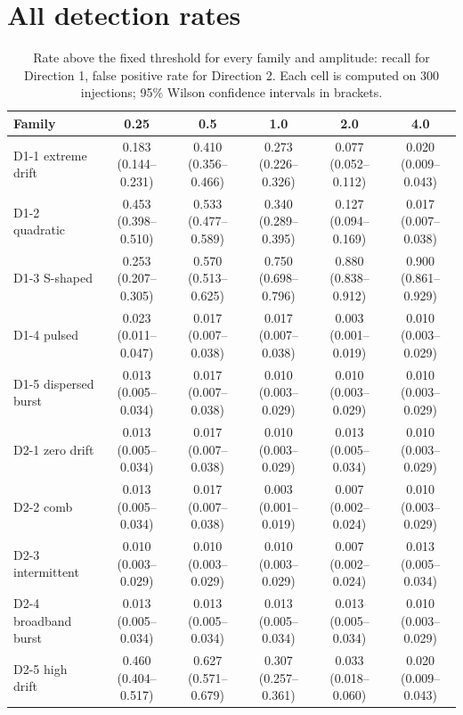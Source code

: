 \documentclass[11pt]{article}
\begin{document}
\section{All detection rates}
\begin{table}[htbp]
\centering
\footnotesize
\setlength{\tabcolsep}{3pt}
\caption{Rate above the fixed threshold for every family and amplitude: recall for Direction 1, false positive rate for Direction 2. Each cell is computed on 300 injections; 95\% Wilson confidence intervals in brackets.}
\label{tab:allrates}
\begin{tabular}{lccccc}
\toprule
Family & 0.25 & 0.5 & 1.0 & 2.0 & 4.0 \\
\midrule
D1-1 extreme drift & 0.183 \scriptsize(0.144--0.231) & 0.410 \scriptsize(0.356--0.466) & 0.273 \scriptsize(0.226--0.326) & 0.077 \scriptsize(0.052--0.112) & 0.020 \scriptsize(0.009--0.043) \\
D1-2 quadratic & 0.453 \scriptsize(0.398--0.510) & 0.533 \scriptsize(0.477--0.589) & 0.340 \scriptsize(0.289--0.395) & 0.127 \scriptsize(0.094--0.169) & 0.017 \scriptsize(0.007--0.038) \\
D1-3 S-shaped & 0.253 \scriptsize(0.207--0.305) & 0.570 \scriptsize(0.513--0.625) & 0.750 \scriptsize(0.698--0.796) & 0.880 \scriptsize(0.838--0.912) & 0.900 \scriptsize(0.861--0.929) \\
D1-4 pulsed & 0.023 \scriptsize(0.011--0.047) & 0.017 \scriptsize(0.007--0.038) & 0.017 \scriptsize(0.007--0.038) & 0.003 \scriptsize(0.001--0.019) & 0.010 \scriptsize(0.003--0.029) \\
D1-5 dispersed burst & 0.013 \scriptsize(0.005--0.034) & 0.017 \scriptsize(0.007--0.038) & 0.010 \scriptsize(0.003--0.029) & 0.010 \scriptsize(0.003--0.029) & 0.010 \scriptsize(0.003--0.029) \\
\midrule
D2-1 zero drift & 0.013 \scriptsize(0.005--0.034) & 0.017 \scriptsize(0.007--0.038) & 0.010 \scriptsize(0.003--0.029) & 0.013 \scriptsize(0.005--0.034) & 0.010 \scriptsize(0.003--0.029) \\
D2-2 comb & 0.013 \scriptsize(0.005--0.034) & 0.017 \scriptsize(0.007--0.038) & 0.003 \scriptsize(0.001--0.019) & 0.007 \scriptsize(0.002--0.024) & 0.010 \scriptsize(0.003--0.029) \\
D2-3 intermittent & 0.010 \scriptsize(0.003--0.029) & 0.010 \scriptsize(0.003--0.029) & 0.010 \scriptsize(0.003--0.029) & 0.007 \scriptsize(0.002--0.024) & 0.013 \scriptsize(0.005--0.034) \\
D2-4 broadband burst & 0.013 \scriptsize(0.005--0.034) & 0.013 \scriptsize(0.005--0.034) & 0.013 \scriptsize(0.005--0.034) & 0.013 \scriptsize(0.005--0.034) & 0.010 \scriptsize(0.003--0.029) \\
D2-5 high drift & 0.460 \scriptsize(0.404--0.517) & 0.627 \scriptsize(0.571--0.679) & 0.307 \scriptsize(0.257--0.361) & 0.033 \scriptsize(0.018--0.060) & 0.020 \scriptsize(0.009--0.043) \\
\bottomrule
\end{tabular}
\end{table}
\end{document}
